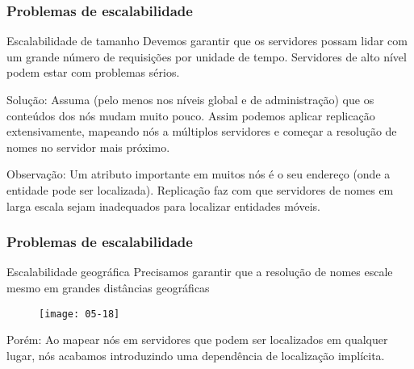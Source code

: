 \documentclass[Ligatures=TeX,table,brazil,svgnames,usetotalslideindicator,compress,10pt]{beamer}
\begin{document}
\begin{frame}
  \frametitle{Problemas de escalabilidade}
  \begin{alertblock}{Escalabilidade de tamanho}
    Devemos garantir que os servidores possam lidar com um grande número de requisições por unidade de tempo. Servidores de alto nível podem estar com problemas sérios.
  \end{alertblock}

  \pause
  \begin{block}{Solução:}
    Assuma (pelo menos nos níveis global e de administração) que os conteúdos dos nós mudam muito pouco. Assim podemos aplicar replicação extensivamente, mapeando nós a múltiplos servidores e começar a resolução de nomes no servidor mais próximo.
  \end{block}

  \pause
  \begin{block}{Observação:}
    Um atributo importante em muitos nós é o seu \alert{endereço} (onde a entidade pode ser localizada). Replicação faz com que servidores de nomes em larga escala sejam inadequados para localizar entidades móveis.
  \end{block}
\end{frame}

\begin{frame}
  \frametitle{Problemas de escalabilidade}
  \begin{alertblock}{Escalabilidade geográfica}
    Precisamos garantir que a resolução de nomes escale mesmo em grandes distâncias geográficas
  \end{alertblock}

  \begin{figure}
    \centering
    \texttt{[image: 05-18]}
  \end{figure}

  \begin{block}{Porém:}
    Ao mapear nós em servidores que podem ser localizados em qualquer lugar, nós acabamos introduzindo uma dependência de localização implícita.
  \end{block}
\end{frame}
\end{document}

